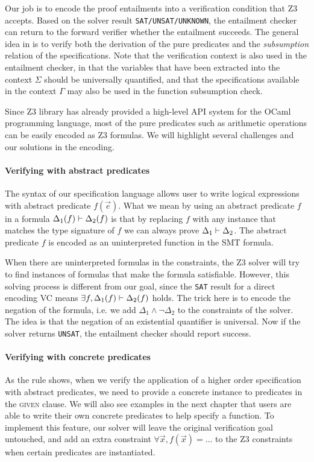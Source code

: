 Our job is to encode the proof entailments into a verification condition that Z3 accepts. Based on the solver result \texttt{SAT/UNSAT/UNKNOWN}, the entailment checker can return to the forward verifier whether the entailment succeeds. The general idea in  is to verify both the derivation of the pure predicates and the \emph{subsumption} relation of the specifications. Note that the verification context is also used in the entailment checker, in that the variables that have been extracted into the context $\Sigma$ should be universally quantified, and that the specifications available in the context $\Gamma$ may also be used in the function subsumption check.

Since Z3 library has already provided a high-level API system for the OCaml programming language, most of the pure predicates such as arithmetic operations can be easily encoded as Z3 formulas. We will highlight several challenges and our solutions in the encoding.

\paragraph{Verifying with abstract predicates} The syntax of our specification language allows user to write logical expressions with abstract predicate ${f(\vec{e})}$.
What we mean by using an abstract predicate $f$ in a formula $\Delta_1(f) \vdash \Delta_2(f)$ is that by replacing $f$ with any instance that matches the type signature of $f$ we can always prove $\Delta_1 \vdash \Delta_2$. The abstract predicate $f$ is encoded as an uninterpreted function in the SMT formula. 

When there are uninterpreted formulas in the constraints, the Z3 solver will try to find instances of formulas that make the formula satisfiable. However, this solving process is different from our goal, since the \texttt{SAT} result for a direct encoding VC means $\exists f, \Delta_1(f) \vdash \Delta_2(f)$ holds.
The trick here is to encode the negation of the formula, i.e. we add $\Delta_1 \wedge \neg \Delta_2$ to the constraints of the solver. The idea is that the negation of an existential quantifier is universal. Now if the solver returns \texttt{UNSAT}, the entailment checker should report success.


\paragraph{Verifying with concrete predicates} As the rule  shows, when we verify the application of a higher order specification with abstract predicates, we need to provide a concrete instance to predicates in the \textsc{given} clause. We will also see examples in the next chapter that users are able to write their own concrete predicates to help specify a function. To implement this feature, our solver will leave the original verification goal untouched, and add an extra constraint $\forall \vec{x}, f(\vec{x}) = \ldots $ to the Z3 constraints when certain predicates are instantiated.

